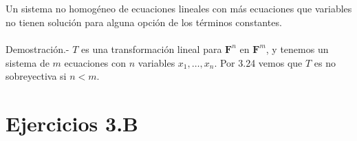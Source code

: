 \setcounter{myteo}{28}
\begin{myteo}\,\\\\
    Un sistema no homogéneo de ecuaciones lineales con más ecuaciones que variables no tienen solución para alguna opción de los términos constantes.\\\\
	Demostración.-\; $T$ es una transformación lineal para $\textbf{F}^n$ en $\textbf{F}^m$, y tenemos un sistema de $m$ ecuaciones con $n$ variables $x_1,\ldots,x_n$. Por 3.24 vemos que $T$ es no sobreyectiva si $n<m$.
\end{myteo}


\section*{Ejercicios 3.B}

